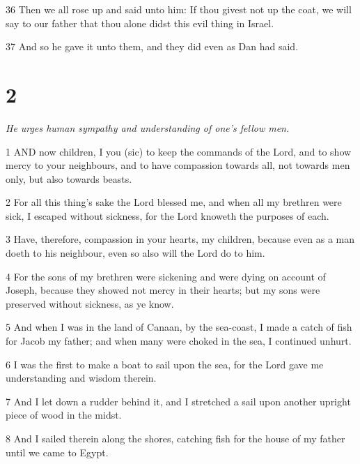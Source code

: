 \par 36 Then we all rose up and said unto him: If thou givest not up the coat, we will say to our father that thou alone didst this evil thing in Israel.

\par 37 And so he gave it unto them, and they did even as Dan had said.

\chapter{2}

\par \textit{He urges human sympathy and understanding of one's fellow men.}

\par 1 AND now children, I you (sic) to keep the commands of the Lord, and to show mercy to your neighbours, and to have compassion towards all, not towards men only, but also towards beasts.

\par 2 For all this thing's sake the Lord blessed me, and when all my brethren were sick, I escaped without sickness, for the Lord knoweth the purposes of each.

\par 3 Have, therefore, compassion in your hearts, my children, because even as a man doeth to his neighbour, even so also will the Lord do to him.

\par 4 For the sons of my brethren were sickening and were dying on account of Joseph, because they showed not mercy in their hearts; but my sons were preserved without sickness, as ye know.

\par 5 And when I was in the land of Canaan, by the sea-coast, I made a catch of fish for Jacob my father; and when many were choked in the sea, I continued unhurt.

\par 6 I was the first to make a boat to sail upon the sea, for the Lord gave me understanding and wisdom therein.

\par 7 And I let down a rudder behind it, and I stretched a sail upon another upright piece of wood in the midst.

\par 8 And I sailed therein along the shores, catching fish for the house of my father until we came to Egypt.

